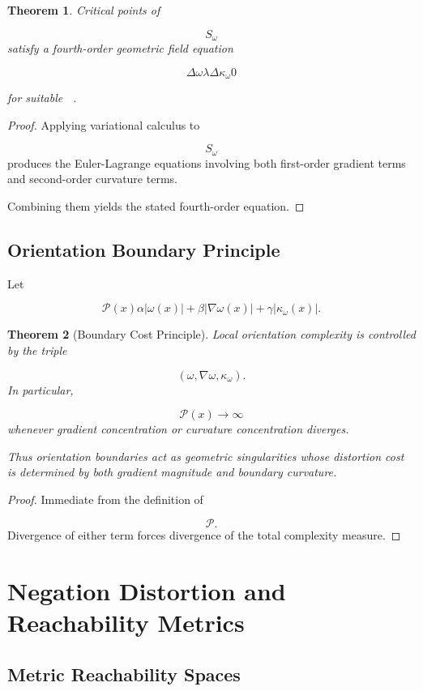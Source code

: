 \documentclass[12pt]{article}
\newtheorem{theorem}{Theorem}[section]
\theoremstyle{remark}
\begin{document}
\begin{theorem}
Critical points of

\[
S_\omega
\]
satisfy a fourth-order geometric field equation

\[
\Delta\omega
\lambda
\Delta\kappa_\omega

0
\]

for suitable \lambda.
\end{theorem}

\begin{proof}
Applying variational calculus to

\[
S_\omega
\]
produces the Euler-Lagrange equations involving both first-order gradient terms and second-order curvature terms.

Combining them yields the stated fourth-order equation.
\end{proof}

\subsection{Orientation Boundary Principle}

Let

\[
\mathcal P(x)
\alpha |\omega(x)|
+
\beta |\nabla\omega(x)|
+
\gamma |\kappa_\omega(x)|.
\]

\begin{theorem}[Boundary Cost Principle]
Local orientation complexity is controlled by the triple

\[
(\omega,\nabla\omega,\kappa_\omega).
\]
In particular,

\[
\mathcal P(x)
\rightarrow \infty
\]
whenever gradient concentration or curvature concentration diverges.

Thus orientation boundaries act as geometric singularities whose distortion cost is determined by both gradient magnitude and boundary curvature.
\end{theorem}

\begin{proof}
Immediate from the definition of

\[
\mathcal P.
\]
Divergence of either term forces divergence of the total complexity measure.
\end{proof}

\section{Negation Distortion and Reachability Metrics}

\subsection{Metric Reachability Spaces}
\end{document}
